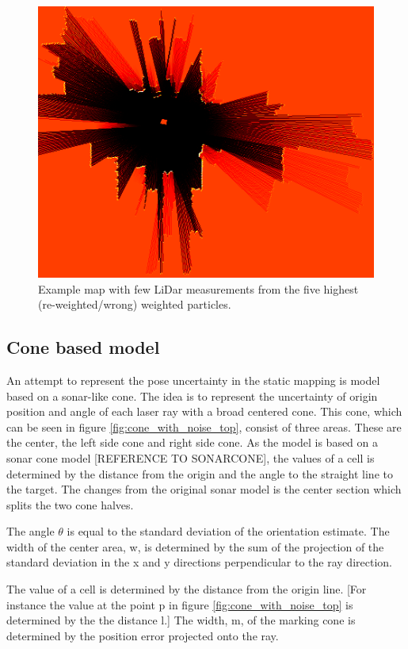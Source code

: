 \begin{figure}
	\centering
	\includegraphics[width=0.7\linewidth]{figures/static_mapping/particle_sensor}
	\caption{Example map with few LiDar measurements from the five highest (re-weighted/wrong) weighted particles.}
	\label{fig:particle_sensor}
\end{figure}

\subsection{Cone based model}
An attempt to represent the pose uncertainty in the static mapping is model based on a sonar-like cone. The idea is to represent the uncertainty of origin position and angle of each laser ray with a broad centered cone. 
This cone, which can be seen in figure  \ref{fig:cone_with_noise_top}, consist of three areas. These are the center, the left side cone and right side cone. As the model is based on a sonar cone model [REFERENCE TO SONARCONE], the values of a cell is determined by the distance from the origin and the angle to the straight line to the target. The changes from the original sonar model is the center section which splits the two cone halves. 

The angle \(\theta\) is equal to the standard deviation of the orientation estimate. 
The width of the center area, w, is determined by the sum of the projection of the standard deviation in the x and y directions perpendicular to the ray direction. 

The value of a cell is determined by the distance from the origin line. [For instance the value at the point p in figure \ref{fig:cone_with_noise_top} is determined by the the distance l.] The width, m, of the marking cone is determined by the position error projected onto the ray.

